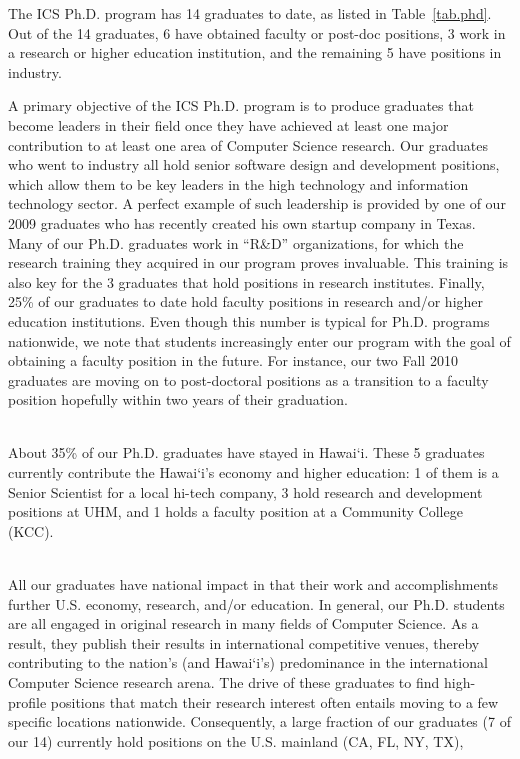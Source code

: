 \documentclass[12pt]{article}
\begin{document}
The ICS Ph.D. program has 14 graduates to date, as
listed in Table~\ref{tab.phd}.  Out of the 14 graduates, 6 have
obtained faculty or post-doc positions, 3 work in a research or higher education
institution, and the remaining 5 have positions in industry.

A primary objective of the ICS Ph.D. program is to produce graduates that
become leaders in their field once they have achieved at least one major
contribution to at least one area of Computer Science research. Our
graduates who went to industry all hold senior software design and
development positions, which allow them to be key leaders in the high
technology and information technology sector. A perfect example of such
leadership is provided by one of our 2009 graduates who has recently
created his own startup company in Texas. Many of our Ph.D. graduates work
in ``R\&D'' organizations, for which the research training they 
acquired in our program proves invaluable.  This training is also key for
the 3 graduates that hold positions in research institutes.  Finally, 25\%
of our graduates to date hold faculty positions in research and/or higher
education institutions. Even though this number is typical for Ph.D.
programs nationwide, we note that students increasingly enter our program
with the goal of obtaining a faculty position in the future. For instance,
our two Fall 2010 graduates are moving on to post-doctoral positions as a
transition to a faculty position hopefully within two years of their
graduation.

~\\
 About 35\% of our Ph.D. graduates have
stayed in Hawai`i.  These 5 graduates currently contribute the Hawai`i's
economy and higher education: 1 of them is a Senior Scientist for a
local hi-tech company, 3 hold research and development positions
at UHM, and 1 holds a faculty position at a Community College (KCC). 

~\\
 All our graduates have
national impact in that their work and accomplishments further U.S.
economy, research, and/or education.  In general, our Ph.D. students
are all engaged in original research in many fields of Computer
Science. As a result, they publish their results in international
competitive venues, thereby contributing to the nation's (and
Hawai`i's) predominance in the international Computer Science research
arena.  The drive of these graduates to find high-profile positions
that match their research interest often entails moving to a few
specific locations nationwide.  Consequently, a large fraction of our
graduates (7 of our 14) currently hold positions on the U.S. mainland
(CA, FL, NY, TX),
\end{document}
